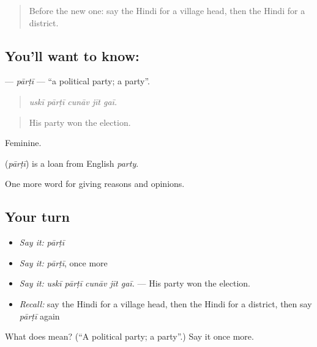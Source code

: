 \label{lesson:HI-C370-parti}



\begin{quote}
Before the new one: say the Hindi for a village head, then the Hindi for a district.
\end{quote}

\subsection*{You'll want to know: }
\textbf{} — \emph{pārṭī} — \textquotedblleft{}a political party; a party\textquotedblright{}.

\begin{quote}
    
\end{quote}

\begin{quote}
\emph{uskī pārṭī cunāv jīt gaī.}
\end{quote}

\begin{quote}
His party won the election.
\end{quote}

Feminine.

\begin{cousinweb}
\textbf{} (\emph{pārṭī}) is a loan from English \emph{party}.
\end{cousinweb}

\begin{grammarlens}[title={What you've built}]
One more word for giving reasons and opinions.
\end{grammarlens}

\subsection*{Your turn}
\begin{itemize}
\raggedright
  \item \emph{Say it:} \emph{pārṭī}
  \item \emph{Say it:} \emph{pārṭī}, once more
  \item \emph{Say it:} \emph{uskī pārṭī cunāv jīt gaī.} — His party won the election.
  \item \emph{Recall:} say the Hindi for a village head, then the Hindi for a district, then say \emph{pārṭī} again
\end{itemize}

\begin{tcolorbox}[breakable,colback=teal!4,colframe=teal!35!black,title={Before you move on}]
What does  mean? (\textquotedblleft{}A political party; a party\textquotedblright{}.) Say it once more.
\end{tcolorbox}
